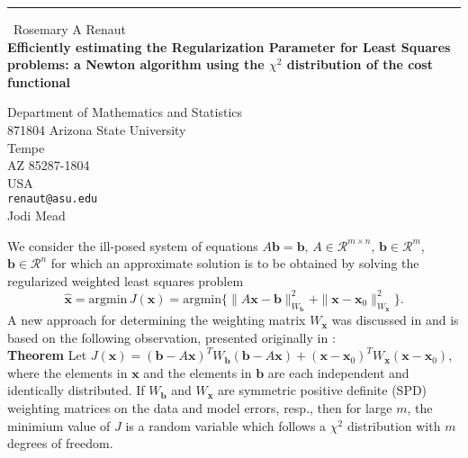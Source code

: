 \documentclass{report}
\begin{document}
\begin{center}
\rule{6in}{1pt} \
{\large Rosemary A Renaut \\
{\bf Efficiently estimating the Regularization Parameter for Least Squares problems: a Newton algorithm using the $\chi^2$ distribution of the cost functional }}

Department of Mathematics and Statistics \\ 871804 Arizona State University \\ Tempe \\ AZ 85287-1804 \\ USA
\\
{\tt renaut@asu.edu}\\
Jodi Mead\end{center}

We consider the ill-posed system of equations $A\mathbf{b}=\mathbf{b}$,
$A \in \mathcal{R}^{m\times n}$, $\mathbf{b} \in \mathcal{R}^m$,
$\mathbf{b} \in \mathcal{R}^n$ for which an approximate solution is to be
obtained by solving the regularized weighted least squares problem
\begin{equation} \label{eq:rls}
\hat{\mathbf{x}} = \mathrm{argmin}\, J(\mathbf{x}) =\mathrm{argmin} \{
\|A\mathbf{x}-\mathbf{b}\|^2_{W_\mathbf{b}} +
\|\mathbf{x}-\mathbf{x}_0\|^2_{W_\mathbf{x}}\}.
\end{equation}
A new approach for determining the weighting matrix $W_\mathbf{x}$ was
discussed in \cite{mead:07} and is based on the following observation,
presented originally in \cite{Rao:73}:\\

\textbf{Theorem}
Let $J(\mathbf{x}) = (\mathbf{b}-A\mathbf{x})^TW_\mathbf{b}
(\mathbf{b}-A\mathbf{x}) + (\mathbf{x} - \mathbf{x}_0)^TW_\mathbf{x}
(\mathbf{x}-\mathbf{x}_0)$, where the elements
in $\mathbf{x}$ and the elements in $\mathbf{b}$ are each independent and
identically distributed. If $W_\mathbf{b}$ and $W_\mathbf{x}$ are
symmetric positive definite (SPD) weighting matrices on the data and
model errors, resp., then for large $m$, the minimium value of $J$ is a
random variable which follows a $\chi^2$ distribution with $m$ degrees of
freedom.
\end{document}
